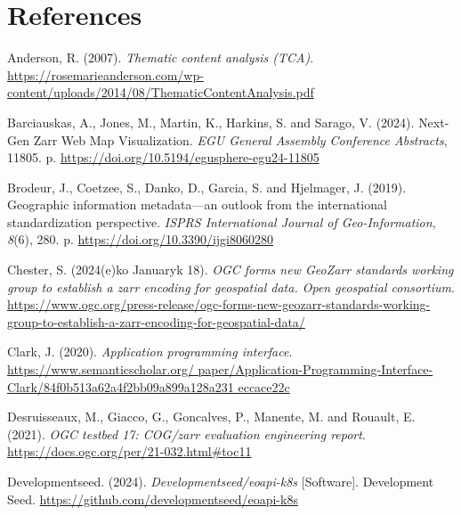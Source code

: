 \documentclass[
  oneside,
  open=any]{scrbook}
\newlength{\cslhangindent}
\newenvironment{CSLReferences}[2] %
 {\begin{list}{}{%
  \setlength{\itemindent}{0pt}
  \setlength{\leftmargin}{0pt}
  \setlength{\parsep}{0pt}
  \ifodd #1
   \setlength{\leftmargin}{\cslhangindent}
   \setlength{\itemindent}{-1\cslhangindent}
  \fi
  \setlength{\itemsep}{#2\baselineskip}}}
 {\end{list}}
\begin{document}
\chapter*{References}\label{references}

\label{refs}
\begin{CSLReferences}{1}{0}
Anderson, R. (2007). \emph{Thematic content analysis ({TCA})}.
\url{https://rosemarieanderson.com/wp-content/uploads/2014/08/ThematicContentAnalysis.pdf}

Barciauskas, A., Jones, M., Martin, K., Harkins, S. and Sarago, V.
(2024). {Next-Gen Zarr Web Map Visualization}. \emph{EGU General
Assembly Conference Abstracts}, 11805. p.
\url{https://doi.org/10.5194/egusphere-egu24-11805}

Brodeur, J., Coetzee, S., Danko, D., Garcia, S. and Hjelmager, J.
(2019). Geographic information metadata---an outlook from the
international standardization perspective. \emph{{ISPRS} International
Journal of Geo-Information}, \emph{8}(6), 280. p.
\url{https://doi.org/10.3390/ijgi8060280}

Chester, S. (2024(e)ko Januaryk 18). \emph{{OGC} forms new {GeoZarr}
standards working group to establish a zarr encoding for geospatial
data. Open geospatial consortium}.
\url{https://www.ogc.org/press-release/ogc-forms-new-geozarr-standards-working-group-to-establish-a-zarr-encoding-for-geospatial-data/}

Clark, J. (2020). \emph{Application programming interface}.
\href{https://www.semanticscholar.org/\%20paper/Application-Programming-Interface-Clark/84f0b513a62a4f2bb09a899a128a231\%20eccace22c}{https://www.semanticscholar.org/
paper/Application-Programming-Interface-Clark/84f0b513a62a4f2bb09a899a128a231
eccace22c}

Desruisseaux, M., Giacco, G., Goncalves, P., Manente, M. and Rouault, E.
(2021). \emph{{OGC} testbed 17: {COG}/zarr evaluation engineering
report}. \url{https://docs.ogc.org/per/21-032.html\#toc11}

Developmentseed. (2024). \emph{Developmentseed/eoapi-k8s}
{[}Software{]}. Development Seed.
\url{https://github.com/developmentseed/eoapi-k8s}


\end{CSLReferences}
\end{document}
